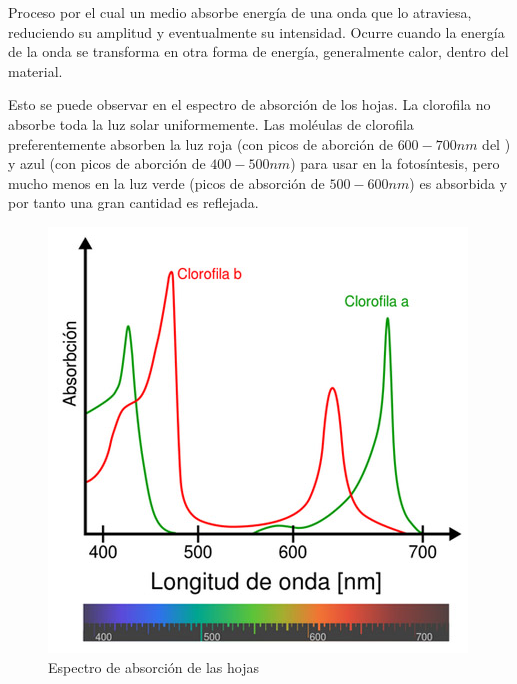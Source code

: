 Proceso por el cual un medio absorbe energía de una onda que lo atraviesa, reduciendo su amplitud y eventualmente su intensidad. Ocurre cuando la energía de la onda se transforma en otra forma de energía, generalmente calor, dentro del material.

Esto se puede observar en el espectro de absorción de los hojas. La clorofila no absorbe toda la luz solar uniformemente. Las moléulas de clorofila preferentemente absorben la luz roja (con picos de aborción de $600-700 nm$ del \EspectroElectromagnetico) y azul (con picos de aborción de $400-500 nm$) para usar en la fotosíntesis, pero mucho menos en la luz verde (picos de absorción de $500-600 nm$) es absorbida y por tanto una gran cantidad es reflejada\cite{doncontrolhojas}.

\begin{figure}[H]
  \centering
  \includegraphics[scale=0.6]{imagenes/absorcion_hojas.png}
  \caption{Espectro de absorción de las hojas\cite{doncontrolhojas}}
\end{figure}
